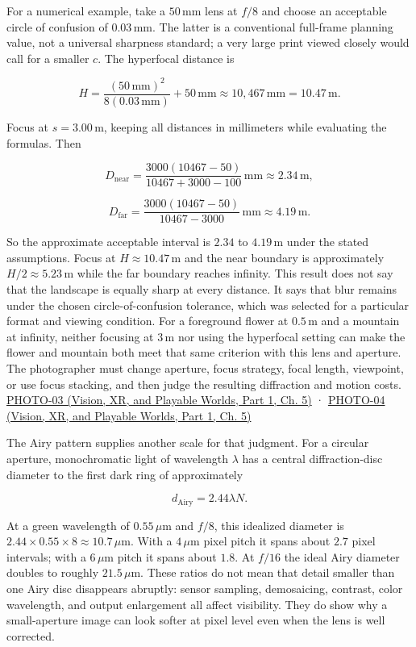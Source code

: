 For a numerical example, take a \(50\,\mathrm{mm}\) lens at \(f/8\) and choose an acceptable circle of confusion of \(0.03\,\mathrm{mm}\). The latter is a conventional full-frame planning value, not a universal sharpness standard; a very large print viewed closely would call for a smaller \(c\). The hyperfocal distance is

\[
H=\frac{(50\,\mathrm{mm})^2}{8(0.03\,\mathrm{mm})}+50\,\mathrm{mm}\approx10{,}467\,\mathrm{mm}=10.47\,\mathrm{m}.
\]

Focus at \(s=3.00\,\mathrm{m}\), keeping all distances in millimeters while evaluating the formulas. Then

\[
D_{\mathrm{near}}=\frac{3000(10467-50)}{10467+3000-100}\,\mathrm{mm}\approx2.34\,\mathrm{m},
\]

\[
D_{\mathrm{far}}=\frac{3000(10467-50)}{10467-3000}\,\mathrm{mm}\approx4.19\,\mathrm{m}.
\]

So the approximate acceptable interval is \(2.34\) to \(4.19\,\mathrm{m}\) under the stated assumptions. Focus at \(H\approx10.47\,\mathrm{m}\) and the near boundary is approximately \(H/2\approx5.23\,\mathrm{m}\) while the far boundary reaches infinity. This result does not say that the landscape is equally sharp at every distance. It says that blur remains under the chosen circle-of-confusion tolerance, which was selected for a particular format and viewing condition. For a foreground flower at \(0.5\,\mathrm{m}\) and a mountain at infinity, neither focusing at \(3\,\mathrm{m}\) nor using the hyperfocal setting can make the flower and mountain both meet that same criterion with this lens and aperture. The photographer must change aperture, focus strategy, focal length, viewpoint, or use focus stacking, and then judge the resulting diffraction and motion costs. \href{../07-Vision-XR-and-Playable-Worlds-P01/main.pdf\#nameddest=04-visual-computing-ii-ch036-photo-03---photography-session-03}{PHOTO-03 (Vision, XR, and Playable Worlds, Part 1, Ch. 5)} · \href{../07-Vision-XR-and-Playable-Worlds-P01/main.pdf\#nameddest=04-visual-computing-ii-ch036-photo-04---photography-session-04}{PHOTO-04 (Vision, XR, and Playable Worlds, Part 1, Ch. 5)}

The Airy pattern supplies another scale for that judgment. For a circular aperture, monochromatic light of wavelength \(\lambda\) has a central diffraction-disc diameter to the first dark ring of approximately

\[
d_{\mathrm{Airy}}=2.44\lambda N.
\]

At a green wavelength of \(0.55\,\mu\mathrm{m}\) and \(f/8\), this idealized diameter is \(2.44\times0.55\times8\approx10.7\,\mu\mathrm{m}\). With a \(4\,\mu\mathrm{m}\) pixel pitch it spans about \(2.7\) pixel intervals; with a \(6\,\mu\mathrm{m}\) pitch it spans about \(1.8\). At \(f/16\) the ideal Airy diameter doubles to roughly \(21.5\,\mu\mathrm{m}\). These ratios do not mean that detail smaller than one Airy disc disappears abruptly: sensor sampling, demosaicing, contrast, color wavelength, and output enlargement all affect visibility. They do show why a small-aperture image can look softer at pixel level even when the lens is well corrected.

